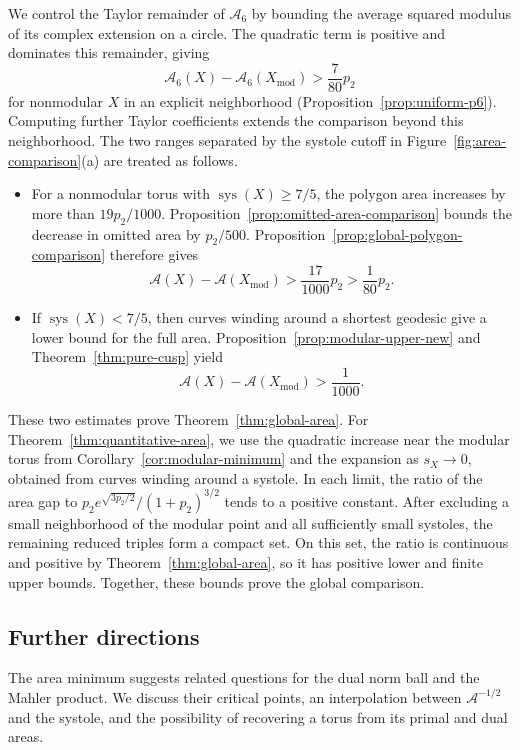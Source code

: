 \documentclass[10pt,twoside]{article}
\theoremstyle{plain}
\theoremstyle{definition}
\theoremstyle{remark}
\DeclareMathOperator{\sys}{sys}
\newcommand{\A}{\mathcal A}
\newcommand{\Xmod}{X_{\mathrm{mod}}}
\begin{document}
We control the Taylor remainder of $\A_6$ by bounding the average
squared modulus of its complex extension on a circle. The quadratic
term is positive and dominates this remainder, giving
$$
\A_6(X)-\A_6(\Xmod)>\frac7{80}p_2
$$
for nonmodular $X$ in an explicit neighborhood
(Proposition~\ref{prop:uniform-p6}).
Computing further Taylor coefficients extends the comparison beyond
this neighborhood. The two ranges separated by the systole cutoff
in Figure~\ref{fig:area-comparison}(a) are treated as follows.
\begin{itemize}
\item
For a nonmodular torus with $\sys(X)\geq7/5$, the polygon area
increases by more than $19p_2/1000$. Proposition~\ref{prop:omitted-area-comparison}
bounds the decrease in omitted area by $p_2/500$.
Proposition~\ref{prop:global-polygon-comparison} therefore gives
$$
\A(X)-\A(\Xmod)>\frac{17}{1000}p_2>\frac1{80}p_2.
$$

\item
If $\sys(X)<7/5$, then curves winding around a shortest
geodesic give a lower bound for the full area. Proposition~\ref{prop:modular-upper-new} and
Theorem~\ref{thm:pure-cusp} yield
$$
\A(X)-\A(\Xmod)>\frac1{1000}.
$$
\end{itemize}
These two estimates prove Theorem~\ref{thm:global-area}.
For Theorem~\ref{thm:quantitative-area}, we use the quadratic increase
near the modular torus from Corollary~\ref{cor:modular-minimum}
and the expansion as $s_X\to0$, obtained from curves winding around
a systole.
In each limit, the ratio of the area gap to
$p_2e^{\sqrt{3p_2/2}}/(1+p_2)^{3/2}$ tends to a positive constant.
After excluding a small neighborhood of the modular point and
all sufficiently small systoles, the remaining reduced triples
form a compact set. On this set, the ratio is continuous and
positive by Theorem~\ref{thm:global-area}, so it has positive
lower and finite upper bounds. Together, these bounds prove
the global comparison.

\subsection{Further directions}\label{sec:Further}

The area minimum suggests related questions for the dual norm ball
and the Mahler product. We discuss their critical points, an
interpolation between $\A^{-1/2}$ and the systole, and the possibility
of recovering a torus from its primal and dual areas.
\end{document}
